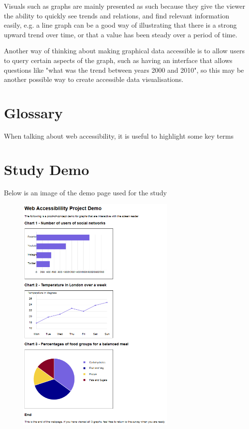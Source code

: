 \documentclass[ %
                    author={Aleena Baig},
                supervisor={Dr Simon Lock},
                    degree={BSc},
                     title={On Making Web Accessible Graphs},
                  subtitle={},
                      year={2019} ]{dissertation}
\begin{document}
Visuals such as graphs are mainly presented as such because they give the viewer the ability to quickly see trends and relations, and find relevant information easily, e.g. a line graph can be a good way of illustrating that there is a strong upward trend over time, or that a value has been steady over a period of time.

Another way of thinking about making graphical data accessible is to allow users to query certain aspects of the graph, such as having an interface that allows questions like "what was the trend between years 2000 and 2010", so this may be another possible way to create accessible data visualisations.

\chapter{Glossary}

When talking about web accessibility, it is useful to highlight some key terms

\BlankLine
%
\glsaddall
\printglossary[nonumberlist]

\appendix
\chapter{Study Demo}
\label{appendix:studydemo}

Below is an image of the demo page used for the study

\begin{figure}[h]
\includegraphics[width=0.7\textwidth]{images/Demo.PNG}
\end{figure}
\end{document}
